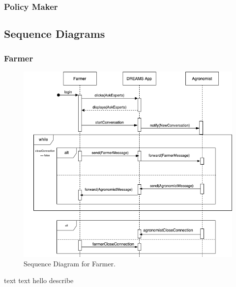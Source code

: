 



\subsubsection{Policy Maker}
%












\newpage
\subsection{Sequence Diagrams}

\subsubsection{Farmer}
\begin{figure}[hbt!]
\centering
\includegraphics[scale=0.6]{Files/sequence_disgrams/thePNGs/farmer_askExperts.png}
\caption{\label{fig:addOne{figure_counter}}Sequence Diagram for Farmer.}
\end{figure}
text text hello describe



